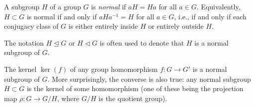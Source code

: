 \documentclass[12pt]{article}
\begin{document}
A subgroup $H$ of a group $G$ is {\em normal} if $aH = Ha$ for all $a \in G$. Equivalently, $H \subset G$ is normal if and only if $aHa^{-1} = H$ for all $a \in G$, i.e., if and only if each conjugacy class of $G$ is either entirely inside $H$ or entirely outside $H$.

The notation $H \trianglelefteq G$ or $H \triangleleft G$ is often used to denote that $H$ is a normal subgroup of $G$.

The kernel $\ker(f)$ of any group homomorphism $f: G \longrightarrow G'$ is a normal subgroup of $G$. More surprisingly, the converse is also true: any normal subgroup $H \subset G$ is the kernel of some homomorphism (one of these being the projection map $\rho: G \longrightarrow G/H$, where $G/H$ is the quotient group).
\end{document}
